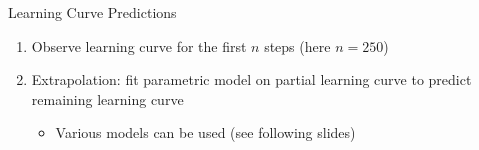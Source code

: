 \begin{frame}{Learning Curve Predictions}
\begin{figure}
    \centering
    
\end{figure}


\begin{enumerate}
  \item Observe learning curve for the first $n$ steps (here $n=250$)
  \fhpause
  \item \alert{Extrapolation}: fit parametric model on partial learning curve to predict remaining learning curve
  \fhpause
  \begin{itemize}
      \item Various models can be used (see following slides) 
  \end{itemize}
  
  
\end{enumerate}

\end{frame}

